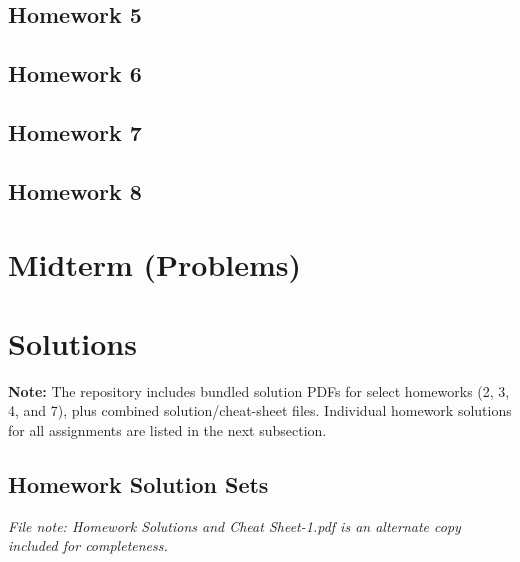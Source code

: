 \documentclass[12pt]{article}
\begin{document}
\subsection*{Homework 5}


\subsection*{Homework 6}


\subsection*{Homework 7}


\subsection*{Homework 8}


\section*{Midterm (Problems)}


\section*{Solutions}
\noindent\textbf{Note:} The repository includes bundled solution PDFs for select homeworks (2, 3, 4, and 7), plus combined solution/cheat-sheet files. Individual homework solutions for all assignments are listed in the next subsection.

\subsection*{Homework Solution Sets}





\noindent\textit{File note: Homework Solutions and Cheat Sheet-1.pdf is an alternate copy included for completeness.}

\end{document}
